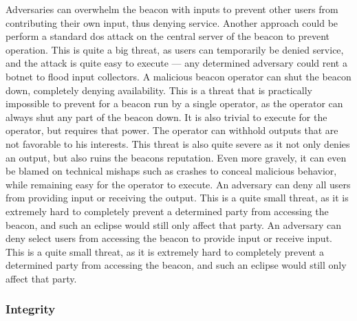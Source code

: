  Adversaries can overwhelm the beacon with inputs to prevent other users from contributing their own input, thus denying service. Another approach could be perform a standard \gls{dos} attack on the central server of the beacon to prevent operation. This is quite a big threat, as users can temporarily be denied service, and the attack is quite easy to execute --- any determined adversary could rent a botnet to flood input collectors.    %
 A malicious beacon operator can shut the beacon down, completely denying availability. This is a threat that is practically impossible to prevent for a beacon run by a single operator, as the operator can always shut any part of the beacon down. It is also trivial to execute for the operator, but requires that power.
 The operator can withhold outputs that are not favorable to his interests. This threat is also quite severe as it not only denies an output, but also ruins the beacons reputation. Even more gravely, it can even be blamed on technical mishaps such as crashes to conceal malicious behavior, while remaining easy for the operator to execute.
 An adversary can deny all users from providing input or receiving the output. This is a quite small threat, as it is extremely hard to completely prevent a determined party from accessing the beacon, and such an eclipse would still only affect that party.
 An adversary can deny select users from accessing the beacon to provide input or receive input. This is a quite small threat, as it is extremely hard to completely prevent a determined party from accessing the beacon, and such an eclipse would still only affect that party.


\subsubsection{Integrity}

